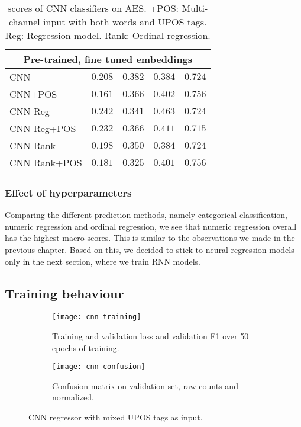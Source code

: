 \begin{table}
\begin{tabular}{lrrrr}
    \midrule
    \multicolumn{5}{c}{Pre-trained, fine tuned embeddings} \\
    \midrule
    CNN & $0.208$ & $0.382$ & $0.384$ & $0.724$ \\
    CNN+POS & $0.161$ & $0.366$ & $0.402$ & $\mathbf{0.756}$ \\
    CNN Reg & $0.242$ & $0.341$ & $\mathbf{0.463}$ & $0.724$ \\
    CNN Reg+POS & $0.232$ & $0.366$ & $0.411$ & $0.715$ \\
    CNN Rank & $0.198$ & $0.350$ & $0.384$ & $0.724$ \\
    CNN Rank+POS & $0.181$ & $0.325$ & $0.401$ & $\mathbf{0.756}$ \\
    \bottomrule
  \end{tabular}
  \caption[\FI scores of CNN classifiers on AES.]{
    \FI scores of CNN classifiers on AES. +POS: Multi-channel input with
    both words and UPOS tags. Reg: Regression model. Rank: Ordinal regression.
  }
  \label{tab:cnn-results}
\end{table}


\subsubsection{Effect of hyperparameters}

Comparing the different prediction methods, namely categorical
classification, numeric regression and ordinal regression, we see that
numeric regression overall has the highest macro \FI scores. This is similar
to the observations we made in the previous chapter. Based on this, we
decided to stick to neural regression models only in the next section, where
we train \ac{RNN} models.


\subsection{Training behaviour}

\begin{figure}
  \begin{subfigure}{\linewidth}
    \centering
    \texttt{[image: cnn-training]}
    \caption{
      Training and validation loss and validation F1 over 50 epochs of
      training.
    }
  \end{subfigure}
  \begin{subfigure}{\linewidth}
    \centering
    \texttt{[image: cnn-confusion]}
    \caption{
      Confusion matrix on validation set, raw counts and normalized.
    }
  \end{subfigure}
  \caption[Training behaviour of CNN regression]{
    CNN regressor with mixed UPOS tags as input.
  }
  \label{fig:cnn-training}
\end{figure}

